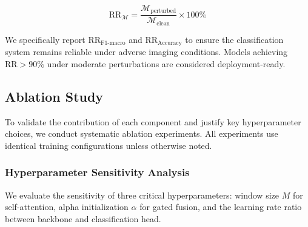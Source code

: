 \begin{equation}
\text{RR}_{\mathcal{M}} = \frac{\mathcal{M}_{\text{perturbed}}}{\mathcal{M}_{\text{clean}}} \times 100\%
\end{equation}

We specifically report $\text{RR}_{\text{F1-macro}}$ and $\text{RR}_{\text{Accuracy}}$ to ensure the classification system remains reliable under adverse imaging conditions. Models achieving $\text{RR} > 90\%$ under moderate perturbations are considered deployment-ready.

\subsection{Ablation Study}
\label{sec:ablation}

To validate the contribution of each component and justify key hyperparameter choices, we conduct systematic ablation experiments. All experiments use identical training configurations unless otherwise noted.

\subsubsection{Hyperparameter Sensitivity Analysis}

We evaluate the sensitivity of three critical hyperparameters: window size $M$ for self-attention, alpha initialization $\alpha$ for gated fusion, and the learning rate ratio between backbone and classification head.

\begin{table}[htbp]
\centering
\caption{Hyperparameter Sensitivity Analysis. Best values in \textbf{bold}.}
\label{tab:hyperparams}
\small
{}
\end{table}

